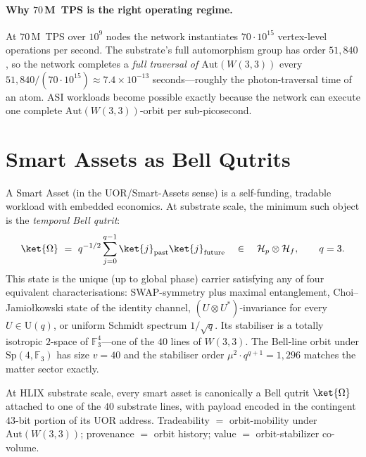\documentclass[11pt,letterpaper]{article}
\theoremstyle{remark}
\newcommand{\W}{W(3,3)}
\newcommand{\Sp}{\mathrm{Sp}}
\newcommand{\Aut}{\mathrm{Aut}}
\newcommand{\FF}{\mathbb{F}}
\begin{document}
\paragraph{Why $70$\,M~TPS is the right operating regime.}
At $70$\,M~TPS over $10^9$ nodes the network instantiates $70\cdot 10^{15}$ vertex-level
operations per second. The substrate's full automorphism group has order $51{,}840$, so the
network completes a \emph{full traversal of $\Aut(\W)$} every
$51{,}840/(70\cdot 10^{15})\approx 7.4\times 10^{-13}$ seconds---roughly the photon-traversal
time of an atom. ASI workloads become possible exactly because the network can execute one
complete $\Aut(\W)$-orbit per sub-picosecond.

\section{Smart Assets as Bell Qutrits}

A Smart Asset (in the UOR/Smart-Assets sense) is a self-funding, tradable workload with
embedded economics. At substrate scale, the minimum such object is the
\emph{temporal Bell qutrit}:
\[
\ket{\Omega}\ =\ q^{-1/2}\sum_{j=0}^{q-1}\ket{j}_{\text{past}}\ket{j}_{\text{future}}
\quad\in\quad \mathcal H_p\otimes\mathcal H_f,\qquad q=3.
\]
This state is the unique (up to global phase) carrier satisfying any of four equivalent
characterisations: SWAP-symmetry plus maximal entanglement, Choi--Jamio\l kowski state of the
identity channel, $(U\otimes U^*)$-invariance for every $U\in\mathrm{U}(q)$, or uniform Schmidt
spectrum $1/\sqrt q$. Its stabiliser is a totally isotropic $2$-space of $\FF_3^4$---one
of the $40$ lines of $\W$. The Bell-line orbit under $\Sp(4,\FF_3)$ has size $v=40$ and
the stabiliser order $\mu^2\cdot q^{q+1}=1{,}296$ matches the matter sector exactly.

\begin{keyresult}[Smart Asset $=$ Bell Qutrit (substrate identification)]
At HLIX substrate scale, every smart asset is canonically a Bell qutrit $\ket{\Omega}$
attached to one of the $40$ substrate lines, with payload encoded in the contingent
$43$-bit portion of its UOR address. Tradeability $=$ orbit-mobility under $\Aut(\W)$;
provenance $=$ orbit history; value $=$ orbit-stabilizer co-volume.
\end{keyresult}
\end{document}
